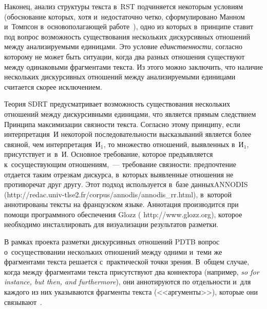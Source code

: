 \begin{multicols}{2}
  Наконец, анализ структуры текста в~RST подчиняется некоторым условиям 
(обоснование которых, хотя и~недостаточно четко, сформулировано Манном 
и~Томпсон в~основополагающей работе~\cite{1-in}), одно из которых 
в~принципе ставит под вопрос возможность существования нескольких 
дискурсивных отношений между анализируемыми единицами. Это условие 
\textit{единственности}, согласно которому не может быть ситуации, когда два 
разных отношения существуют между одинаковыми фрагментами текста. Из 
этого можно заключить, что наличие нескольких дискурсивных отношений 
между анализируемыми единицами считается скорее исключением.
  
  Теория SDRT предусматривает возможность существования нескольких 
отношений между дискурсивными единицами, что является прямым 
след\-ст\-ви\-ем Принципа максимизации связности текс\-та. 
Согласно этому 
принципу, если интерпретация~И некоторой последовательности высказыва\-ний 
является более связной, чем интерпретация~И$_1$, то множество отношений, 
выявленных в~И$_1$, присутствует и~в~И. Основное требование, которое 
предъявляется к~сосуществующим отношениям,~--- требование связ\-ности: 
предпочтение отдается таким отрезкам дискурса, в~которых выявленные 
отношения не противоречат друг другу. Этот подход используется в~базе 
данных\linebreak ANNODIS ({\sf http:/\!/redac.univ-tlse2.fr/corpus/annodis/\linebreak annodis\_rr.html}), 
в~которой аннотированы тексты на французском языке. Аннотация 
производится при помощи программного обеспечения Glozz ({\sf 
http://www.glozz.org}), которое необходимо инсталлировать для визуализации 
результатов разметки. 
  
  В рамках проекта разметки дискурсивных отношений PDTB вопрос 
о~сосуществовании нескольких отношений между одними и~теми же 
фрагментами текста решается с~практической точки зрения. В~общем случае, 
когда между фрагментами текста присутствуют два коннектора (например, 
\textit{so for instance, but then, and furthermore}), они аннотируются по 
отдельности и~для каждого из них указываются фрагменты текста 
(<<аргументы>>), которые они связывают~\cite{9-in}. 
  

\end{multicols}
